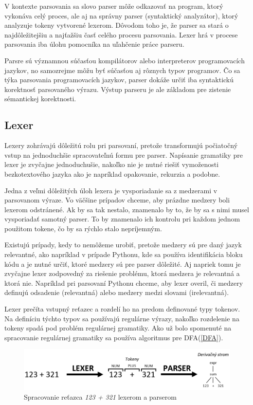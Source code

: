 V kontexte parsovania sa slovo parser môže odkazovať na program, ktorý vykonáva celý proces, ale aj na správny parser (syntaktický analyzátor), ktorý analyzuje tokeny vytvorené lexerom. Dôvodom toho je, že parser sa stará o najdôležitejšiu a najťažšiu časť celého procesu parsovania. Lexer hrá v procese parsovania iba úlohu pomocníka na uľahčenie práce parseru.

Parsre sú významnou súčasťou kompilátorov alebo interpreterov programovacích jazykov, no samozrejme môžu byť súčasťou aj rôznych typov programov. Čo sa týka parsovania programovacích jazykov, parser dokáže určiť iba syntaktickú korektnosť parsovaného výrazu. Výstup parseru je ale základom pre zistenie sémantickej korektnosti.

\subsection{Lexer}\label{lexer}
Lexery zohrávajú dôležitú  rolu pri parsovaní, pretože transformujú počiatočný vstup na jednoduchšie spracovateľnú formu pre parser. Napísanie gramatiky pre lexer je zvyčajne jednoduchušie, nakoľko nie je nutné riešiť vymoženosti bezkotextového jazyka ako je napríklad opakovanie, rekurzia a podobne.

Jedna z veľmi dôležitých úloh lexera je vysporiadanie sa z medzerami v parsovanom výraze. Vo väčšine prípadov chceme, aby prázdne medzery boli lexerom odstránené. Ak by sa tak nestalo, znamenalo by to, že by sa s nimi musel vysporiadať samotný parser. To by znamenalo ich kontrolu pri každom jednom použitom tokene, čo by sa rýchlo stalo nepríjemným.

Existujú prípady, kedy to nemôžeme urobiť, pretože medzery sú pre daný jazyk relevantné, ako napríklad v prípade Pythonu, kde sa používa identifikácia bloku kódu a je nutné určiť, ktoré medzery sú pre parser dôležité. Aj napriek tomu je zvyčajne lexer zodpovedný za riešenie problému, ktorá medzera je relevantná a ktorá nie. Napríklad pri parsovaní Pythonu chceme, aby lexer overil, či medzery definujú odsadenie (relevantná) alebo medzery medzi slovami (irelevantná). \cite{tomassetti:parsing}

Lexer prečíta vstupný reťazec a rozdelí ho na predom definované typy tokenov. Na definíciu týchto typov sa používajú regulárne výrazy, nakoľko rozdelenie na tokeny spadá pod problém regulárnej gramatiky. Ako už bolo spomenuté na spracovanie regulárnej gramatiky sa používa algoritmus pre DFA(\ref{DFA}).

\begin{figure}[H]
\begin{center}
\includegraphics[width=14cm]{figures/lexer_parser.PNG}
\caption{Spracovanie reťazca \textit{123 + 321} lexerom a parserom}
\label{fig:lexer_parser}
\end{center}
\end{figure}

